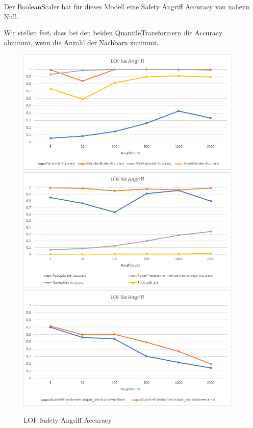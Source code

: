 \documentclass[12pt,a4paper]{scrartcl}
\numberwithin{equation}{section}
\begin{document}
Der BooleanScaler hat für dieses Modell eine Safety Angriff Accuracy von nahezu Null.

Wir stellen fest, dass bei den beiden QuantileTransformern die Accuracy abnimmt, wenn die Anzahl der Nachbarn zunimmt. 

\begin{figure}[ht!]
	\centering
	  \includegraphics[scale=0.45]{sis_lof_1.png}
	  \includegraphics[scale=0.45]{sis_lof_2.png}
	  \includegraphics[scale=0.45]{sis_lof_3.png}
	  \caption{LOF Safety Angriff Accuracy}
	\label{sis_lof_results}
\end{figure}
\end{document}

